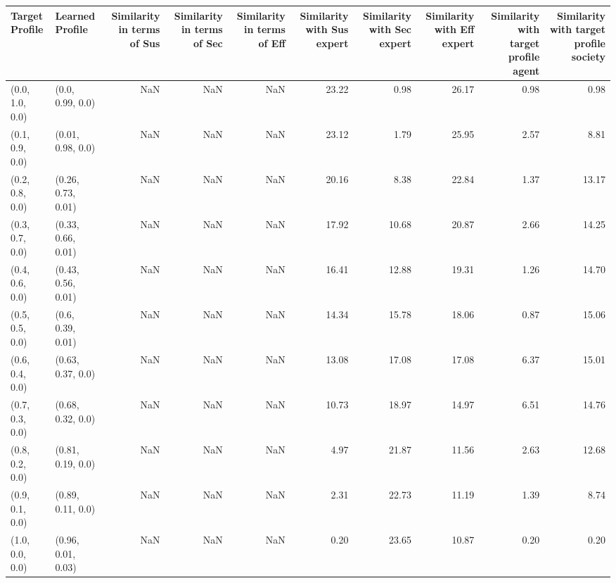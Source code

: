 \begin{tabular}{llrrrrrrrr}
\toprule
Target Profile & Learned Profile & Similarity in terms of Sus & Similarity in terms of Sec & Similarity in terms of Eff & Similarity with Sus expert & Similarity with Sec expert & Similarity with Eff expert & Similarity with target profile agent & Similarity with target profile society \\
\midrule
(0.0, 1.0, 0.0) & (0.0, 0.99, 0.0) & NaN & NaN & NaN & 23.22 & 0.98 & 26.17 & 0.98 & 0.98 \\
(0.1, 0.9, 0.0) & (0.01, 0.98, 0.0) & NaN & NaN & NaN & 23.12 & 1.79 & 25.95 & 2.57 & 8.81 \\
(0.2, 0.8, 0.0) & (0.26, 0.73, 0.01) & NaN & NaN & NaN & 20.16 & 8.38 & 22.84 & 1.37 & 13.17 \\
(0.3, 0.7, 0.0) & (0.33, 0.66, 0.01) & NaN & NaN & NaN & 17.92 & 10.68 & 20.87 & 2.66 & 14.25 \\
(0.4, 0.6, 0.0) & (0.43, 0.56, 0.01) & NaN & NaN & NaN & 16.41 & 12.88 & 19.31 & 1.26 & 14.70 \\
(0.5, 0.5, 0.0) & (0.6, 0.39, 0.01) & NaN & NaN & NaN & 14.34 & 15.78 & 18.06 & 0.87 & 15.06 \\
(0.6, 0.4, 0.0) & (0.63, 0.37, 0.0) & NaN & NaN & NaN & 13.08 & 17.08 & 17.08 & 6.37 & 15.01 \\
(0.7, 0.3, 0.0) & (0.68, 0.32, 0.0) & NaN & NaN & NaN & 10.73 & 18.97 & 14.97 & 6.51 & 14.76 \\
(0.8, 0.2, 0.0) & (0.81, 0.19, 0.0) & NaN & NaN & NaN & 4.97 & 21.87 & 11.56 & 2.63 & 12.68 \\
(0.9, 0.1, 0.0) & (0.89, 0.11, 0.0) & NaN & NaN & NaN & 2.31 & 22.73 & 11.19 & 1.39 & 8.74 \\
(1.0, 0.0, 0.0) & (0.96, 0.01, 0.03) & NaN & NaN & NaN & 0.20 & 23.65 & 10.87 & 0.20 & 0.20 \\
\bottomrule
\end{tabular}
